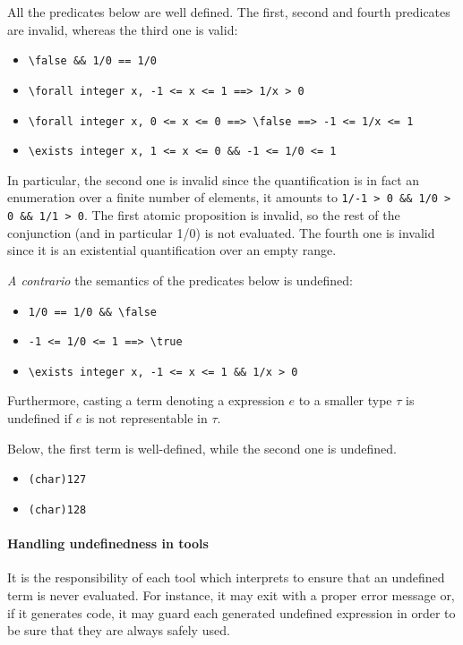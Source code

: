 \begin{example}\label{ex:semantics}
  All the predicates below are well defined. The first, second and fourth
  predicates are invalid, whereas the third one is valid:
\begin{itemize}
\item \lstinline|\false && 1/0 == 1/0|
\item \lstinline|\forall integer x, -1 <= x <= 1 ==> 1/x > 0|
\item \lstinline|\forall integer x, 0 <= x <= 0 ==> \false ==> -1 <= 1/x <= 1|
\item \lstinline|\exists integer x, 1 <= x <= 0 && -1 <= 1/0 <= 1|
\end{itemize}
In particular, the second one is invalid since the quantification is in fact an
enumeration over a finite number of elements, it amounts to
\lstinline|1/-1 > 0 && 1/0 > 0 && 1/1 > 0|. The first atomic proposition is
invalid, so the rest of the conjunction (and in particular 1/0) is not
evaluated. The fourth one is invalid since it is an existential quantification
over an empty range.

\emph{A contrario} the semantics of the predicates below is undefined:
\begin{itemize}
\item \lstinline|1/0 == 1/0 && \false|
\item \lstinline|-1 <= 1/0 <= 1 ==> \true|
\item \lstinline|\exists integer x, -1 <= x <= 1 && 1/x > 0 |
\end{itemize}
\end{example}

Furthermore, casting a term denoting a \C expression $e$ to a smaller type
$\tau$ is undefined if $e$ is not representable in $\tau$.

\begin{example}
Below, the first term is well-defined, while the second one is undefined.
\begin{itemize}
\item \lstinline|(char)127|
\item \lstinline|(char)128|
\end{itemize}
\end{example}

\paragraph{Handling undefinedness in tools}

It is the responsibility of each tool which interprets \eacsl to ensure that an
undefined term is never evaluated. For instance, it may exit with a proper
error message or, if it generates \C code, it may guard each generated
undefined \C expression in order to be sure that they are always safely used.

